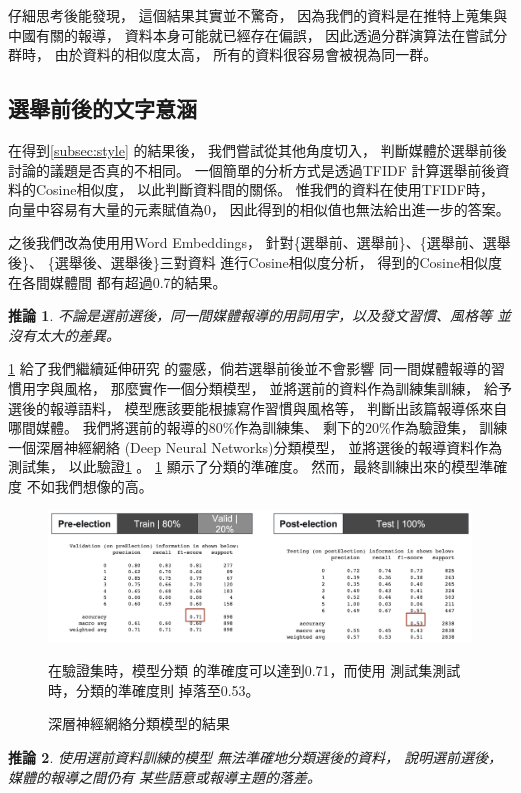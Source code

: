 \documentclass[12pt,twocolumn,letterpaper]{article}
\newtheorem{corollary}{推論}
\begin{document}
仔細思考後能發現，
這個結果其實並不驚奇，
因為我們的資料是在推特上蒐集與
中國有關的報導，
資料本身可能就已經存在偏誤，
因此透過分群演算法在嘗試分群時，
由於資料的相似度太高，
所有的資料很容易會被視為同一群。


\subsection{選舉前後的文字意涵}\label{subsec:word}
在得到\cref{subsec:style} 的結果後，
我們嘗試從其他角度切入，
判斷媒體於選舉前後討論的議題是否真的不相同。
一個簡單的分析方式是透過TFIDF
計算選舉前後資料的Cosine相似度，
以此判斷資料間的關係。
惟我們的資料在使用TFIDF時，
向量中容易有大量的元素賦值為0，
因此得到的相似值也無法給出進一步的答案。


之後我們改為使用用Word Embeddings，
針對\{選舉前、選舉前\}、\{選舉前、選舉後\}、
\{選舉後、選舉後\}三對資料
進行Cosine相似度分析，
得到的Cosine相似度在各間媒體間
都有超過0.7的結果。

\begin{corollary}\label{cor:press}
不論是選前選後，同一間媒體報導的用詞用字，以及發文習慣、風格等
並沒有太大的差異。
\end{corollary}
\cref{cor:press} 給了我們繼續延伸研究
的靈感，倘若選舉前後並不會影響
同一間媒體報導的習慣用字與風格，
那麼實作一個分類模型，
並將選前的資料作為訓練集訓練，
給予選後的報導語料，
模型應該要能根據寫作習慣與風格等，
判斷出該篇報導係來自哪間媒體。
我們將選前的報導的$80\%$作為訓練集、
剩下的$20\%$作為驗證集，
訓練一個深層神經網絡
(Deep Neural Networks)分類模型，
並將選後的報導資料作為測試集，
以此驗證\cref{cor:press} 。
\cref{fig:DNN} 顯示了分類的準確度。
然而，最終訓練出來的模型準確度
不如我們想像的高。

\begin{figure}[htp!]\label{fig:DNN}
    \centering
    \begin{minipage}{0.9\textwidth}
    \includegraphics[width=\linewidth]{Figure/DNN.png}
    {\footnotesize 在驗證集時，模型分類
    的準確度可以達到0.71，而使用
    測試集測試時，分類的準確度則
    掉落至0.53。
    \par}
    \end{minipage}
    \caption{深層神經網絡分類模型的結果}
    \label{fig:DNN}
\end{figure}
\begin{corollary}\label{cor:gap}
使用選前資料訓練的模型
無法準確地分類選後的資料，
說明選前選後，媒體的報導之間仍有
某些語意或報導主題的落差。
\end{corollary}
\end{document}
